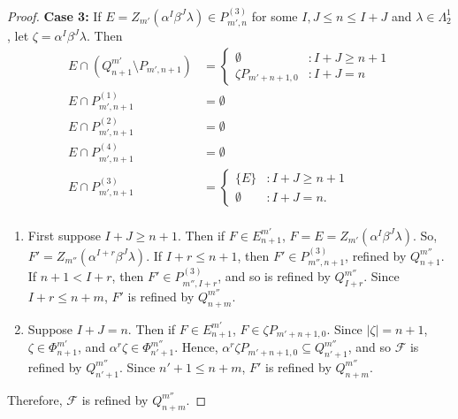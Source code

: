 \documentclass[12pt]{amsart}
\newcommand{\sm}{\setminus}
\newcommand{\sse}{\subseteq}
\newcommand{\mc}[1]{\mathcal{#1}}
\newcommand{\emp}{\emptyset}
\newcommand{\al}{\alpha}
\newcommand{\be}{\beta}
\newcommand{\ze}{\zeta}
\newcommand{\la}{\lambda}
\newcommand{\La}{\Lambda}
\theoremstyle{plain} %
\theoremstyle{definition} %
\begin{document}
\begin{proof}
    \textbf{Case 3:} If $E = Z_{m'}(\al^I \be^J \la) \in P^{(3)}_{m',n}$ for some $I, J \leq n \leq I+J$ and $\la \in \La_2^1$, let $\ze = \al^I \be^J \la$. Then
    \begin{align*}
        E \cap (Q^{m'}_{n+1} \sm P_{m', n+1}) &= \begin{cases}
            \emp &: I+J \geq n+1\\
            \ze P_{m'+n+1, 0} &: I+J=n
        \end{cases}\\
        E \cap P^{(1)}_{m',n+1} &= \emp\\
        E \cap P^{(2)}_{m',n+1} &= \emp\\
        E \cap P^{(4)}_{m',n+1} &= \emp \\
        E \cap P^{(3)}_{m',n+1} &= \begin{cases}
            \{E\} &: I+J \geq n+1\\ \emp &: I+J = n.
        \end{cases}\\
    \end{align*}
    \begin{enumerate}
        \item First suppose $I+J \ge n+1$. Then if $F \in E_{n+1}^{m'}$, $F = E = Z_{m'}(\al^I \be^J \la)$. So, $F' = Z_{m''}(\al^{I+r}\be^J \la)$. If $I+r \le n+1$, then $F' \in P^{(3)}_{m'', n+1}$, refined by $Q_{n+1}^{m''}$. If $n+1 < I+r$, then $F' \in P^{(3)}_{m'',I+r}$, and so is refined by $Q^{m''}_{I+r}$. Since $I+r \leq n+m$, $F'$ is refined by $Q_{n+m}^{m''}$.

        \item Suppose $I+J = n$. Then if $F \in E_{n+1}^{m'}$, $F \in \ze P_{m'+n+1, 0}$. Since $|\ze| = n + 1$, $\ze \in \Phi_{n+1}^{m'}$, and $\al^r \ze \in \Phi_{n'+1}^{m''}$. Hence, $\al^r \ze P_{m'+n+1,0} \sse Q_{n'+1}^{m''}$, and so $\mc{F}$ is refined by $Q_{n'+1}^{m''}$. Since $n'+1 \leq n+m$, $F'$ is refined by $Q_{n+m}^{m''}$.
    \end{enumerate}
    Therefore, $\mc{F}$ is refined by $Q_{n+m}^{m''}$.


\end{proof}
\end{document}
